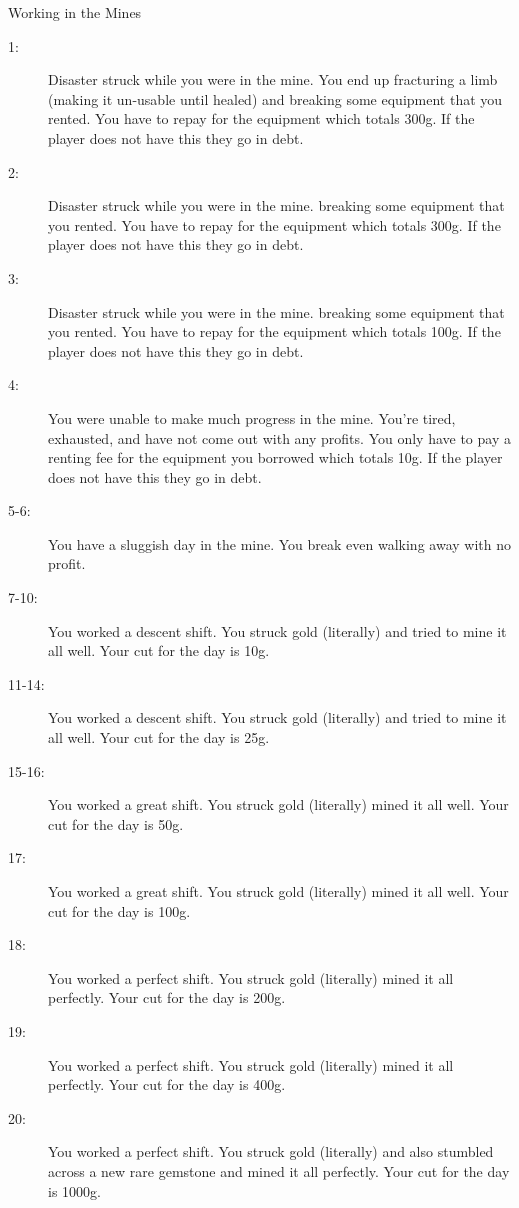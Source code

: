 \begin{commentbox}{Working in the Mines}
	\begin{description}
		\item[1:] Disaster struck while you were in the mine. You end up fracturing a limb (making it un-usable until healed) and breaking some equipment that you rented. You have to repay for the equipment which totals 300g. If the player does not have this they go in debt.
		\item[2:] Disaster struck while you were in the mine. breaking some equipment that you rented. You have to repay for the equipment which totals 300g. If the player does not have this they go in debt.
		\item[3:] Disaster struck while you were in the mine. breaking some equipment that you rented. You have to repay for the equipment which totals 100g. If the player does not have this they go in debt.
		\item[4:] You were unable to make much progress in the mine. You're tired, exhausted, and have not come out with any profits. You only have to pay a renting fee for the equipment you borrowed which totals 10g. If the player does not have this they go in debt.
		\item[5-6:] You have a sluggish day in the mine. You break even walking away with no profit.
		\item[7-10:] You worked a descent shift. You struck gold (literally) and tried to mine it all well. Your cut for the day is 10g.
		\item[11-14:] You worked a descent shift. You struck gold (literally) and tried to mine it all well. Your cut for the day is 25g.
		\item[15-16:] You worked a great shift. You struck gold (literally) mined it all well. Your cut for the day is 50g.
		\item[17:] You worked a great shift. You struck gold (literally) mined it all well. Your cut for the day is 100g.
		\item[18:] You worked a perfect shift. You struck gold (literally) mined it all perfectly. Your cut for the day is 200g.
		\item[19:] You worked a perfect shift. You struck gold (literally) mined it all perfectly. Your cut for the day is 400g.
		\item[20:] You worked a perfect shift. You struck gold (literally) and also stumbled across a new rare gemstone and mined it all perfectly. Your cut for the day is 1000g.
	\end{description}
\end{commentbox}

